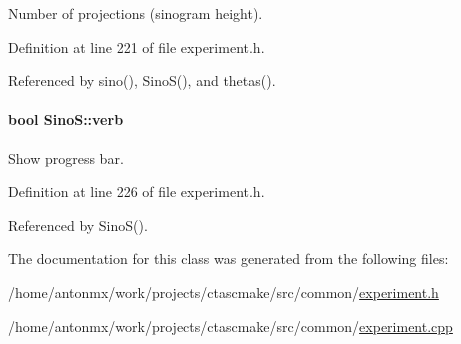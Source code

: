 Number of projections (sinogram height). 



Definition at line 221 of file experiment.h.



Referenced by sino(), SinoS(), and thetas().

\hypertarget{classSinoS_aaf5cf61cb386b132028f78310d070569}{
\paragraph[{verb}]{\setlength{\rightskip}{0pt plus 5cm}bool {\bf SinoS::verb}}\hfill}
\label{classSinoS_aaf5cf61cb386b132028f78310d070569}


Show progress bar. 



Definition at line 226 of file experiment.h.



Referenced by SinoS().



The documentation for this class was generated from the following files:\begin{DoxyCompactItemize}
\item 
/home/antonmx/work/projects/ctascmake/src/common/\hyperlink{experiment_8h}{experiment.h}\item 
/home/antonmx/work/projects/ctascmake/src/common/\hyperlink{experiment_8cpp}{experiment.cpp}\end{DoxyCompactItemize}
